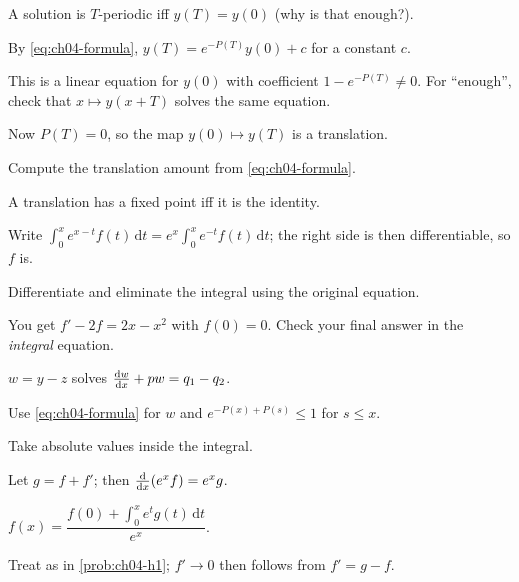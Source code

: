 \begin{hintlevels}
  \item A solution is $T$-periodic iff $y(T) = y(0)$ (why is that enough?).
  \item By \eqref{eq:ch04-formula}, $y(T) = e^{-P(T)}y(0) + c$ for a constant $c$.
  \item This is a linear equation for $y(0)$ with coefficient
        $1 - e^{-P(T)}\neq 0$. For ``enough'', check that $x\mapsto y(x+T)$
        solves the same equation.
\end{hintlevels}

\begin{hintlevels}
  \item Now $P(T) = 0$, so the map $y(0)\mapsto y(T)$ is a translation.
  \item Compute the translation amount from \eqref{eq:ch04-formula}.
  \item A translation has a fixed point iff it is the identity.
\end{hintlevels}

\begin{hintlevels}
  \item Write $\int_0^xe^{x-t}f(t)\,\mathrm{d}t = e^x\int_0^xe^{-t}f(t)\,\mathrm{d}t$;
        the right side is then differentiable, so $f$ is.
  \item Differentiate and eliminate the integral using the original equation.
  \item You get $f' - 2f = 2x - x^2$ with $f(0) = 0$. Check your final answer in
        the \emph{integral} equation.
\end{hintlevels}

\begin{hintlevels}
  \item $w = y - z$ solves $\frac{\mathrm{d}w}{\mathrm{d}x} + pw = q_1 - q_2$.
  \item Use \eqref{eq:ch04-formula} for $w$ and $e^{-P(x)+P(s)}\le 1$ for
        $s\le x$.
  \item Take absolute values inside the integral.
\end{hintlevels}

\begin{hintlevels}
  \item Let $g = f + f'$; then $\frac{\mathrm{d}}{\mathrm{d}x}(e^xf) = e^xg$.
  \item $f(x) = \dfrac{f(0) + \int_0^xe^tg(t)\,\mathrm{d}t}{e^x}$.
  \item Treat as in \cref{prob:ch04-h1}; $f'\to0$ then follows from
        $f' = g - f$.
\end{hintlevels}

